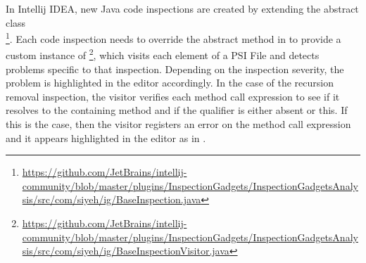 In Intellij IDEA, new Java code inspections are created by extending the abstract class\\
\footnote{\url{https://github.com/JetBrains/intellij-community/blob/master/plugins/InspectionGadgets/InspectionGadgetsAnalysis/src/com/siyeh/ig/BaseInspection.java}}.
Each code inspection needs to override the abstract method  in 
to provide a custom instance of \footnote{\url{https://github.com/JetBrains/intellij-community/blob/master/plugins/InspectionGadgets/InspectionGadgetsAnalysis/src/com/siyeh/ig/BaseInspectionVisitor.java}},
which visits each element of a PSI File and detects problems specific to that inspection. Depending on the inspection
severity, the problem is highlighted in the editor accordingly. In the case of the recursion removal inspection,
the visitor verifies each method call expression to see if it resolves to the containing method and if the qualifier
is either absent or this. If this is the case, then the visitor registers an error on the method call expression and it
appears highlighted in the editor as in .

